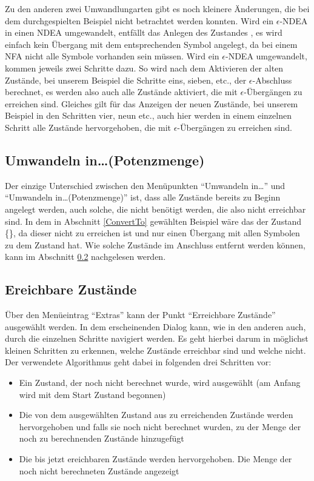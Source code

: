 Zu den anderen zwei Umwandlungarten gibt es noch kleinere Änderungen, die bei dem
durchgespielten Beispiel nicht betrachtet werden konnten. Wird ein
$\epsilon$-NDEA in einen NDEA umgewandelt, entfällt das Anlegen des Zustandes
\State{$\emptyset$}, es wird einfach kein Übergang mit dem entsprechenden Symbol
angelegt, da bei einem NFA nicht alle Symbole vorhanden sein müssen. Wird ein
$\epsilon$-NDEA umgewandelt, kommen jeweils zwei Schritte dazu. So wird nach dem
Aktivieren der alten Zustände, bei unserem Beispiel die Schritte eins, sieben,
etc., der $\epsilon$-Abschluss berechnet, es werden also auch alle Zustände
aktiviert, die mit $\epsilon$-Übergängen zu erreichen sind. Gleiches gilt für das
Anzeigen der neuen Zustände, bei unserem Beispiel in den Schritten vier, neun
etc., auch hier werden in einem einzelnen Schritt alle Zustände hervorgehoben,
die mit $\epsilon$-Übergängen zu erreichen sind.


\subsection{Umwandeln in\ldots (Potenzmenge)}
Der einzige Unterschied zwischen den Menüpunkten "`Umwandeln in\ldots"' und
"`Umwandeln in\ldots (Potenzmenge)"' ist, dass alle Zustände bereits zu Beginn
angelegt werden, auch solche, die nicht benötigt werden, die also nicht
erreichbar sind. In dem in Abschnitt \ref{ConvertTo} gewählten Beispiel wäre das
der Zustand \{\}, da dieser nicht zu erreichen ist und nur einen
Übergang mit allen Symbolen zu dem Zustand \State{$\emptyset$} hat. Wie solche
Zustände im Anschluss entfernt werden können, kann im Abschnitt
\ref{ReachableStates} nachgelesen werden.


\subsection{Ereichbare Zustände}\label{ReachableStates}

Über den Menüeintrag "`Extras"' kann der Punkt "`Erreichbare Zustände"'
ausgewählt werden. In dem erscheinenden Dialog kann, wie in den anderen auch,
durch die einzelnen Schritte navigiert werden. Es geht hierbei darum in möglichst
kleinen Schritten zu erkennen, welche Zustände erreichbar sind und welche nicht.
Der verwendete Algorithmus geht dabei in folgenden drei Schritten vor:

\begin{itemize}
  \item Ein Zustand, der noch nicht berechnet wurde, wird ausgewählt (am Anfang
  wird mit dem Start Zustand begonnen)
  \item Die von dem ausgewählten Zustand aus zu erreichenden Zustände werden
  hervorgehoben und falls sie noch nicht berechnet wurden, zu der Menge der noch
  zu berechnenden Zustände hinzugefügt
  \item Die bis jetzt ereichbaren Zustände werden hervorgehoben. Die Menge der
  noch nicht berechneten Zustände angezeigt 
\end{itemize}

